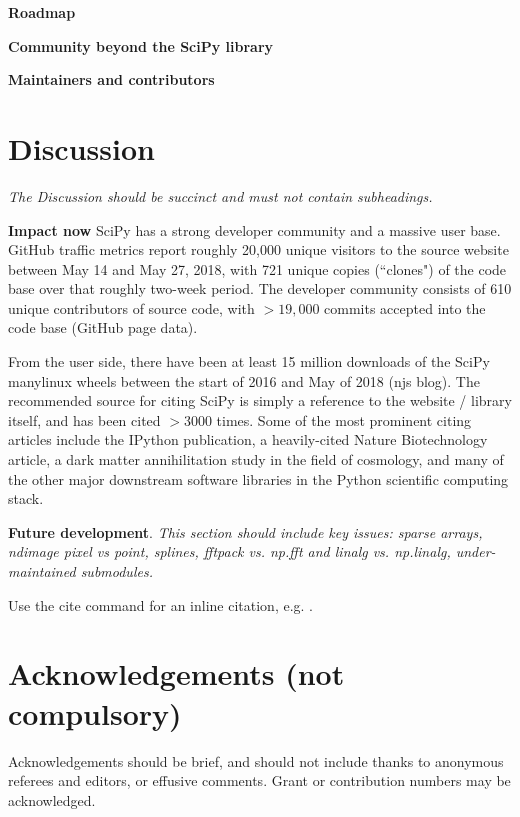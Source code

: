 \documentclass[fleqn,10pt]{wlscirep}
\begin{document}
\textbf{Roadmap}

\textbf{Community beyond the SciPy library}

\textbf{Maintainers and contributors}


\section*{Discussion}

\textit{The Discussion should be succinct and must not contain subheadings.}

\textbf{Impact now}
SciPy has a strong developer community and a massive user base. GitHub
traffic metrics report roughly 20,000 unique visitors to the source
website between May 14 and May 27, 2018, with 721 unique copies (``clones")
of the code base over that roughly two-week period. The developer community
consists of 610 unique contributors of source code, with $>19,000$ commits
accepted into the code base (GitHub page data).

From the user side, there have been at least 15 million downloads
of the SciPy manylinux wheels between the start of 2016 and May of 2018
(njs blog). The recommended source for citing SciPy is simply a reference
to the website / library itself\cite{SciPylib}, and has been cited $>3000$
times. Some of the most prominent citing articles include the IPython
publication\cite{PER-GRA:2007}, a heavily-cited Nature Biotechnology
article\cite{pmid17287757}, a dark
matter annihilitation study in the field of
cosmology\cite{1475-7516-2012-08-007}, and many of the
other major downstream software libraries in the Python scientific
computing stack.

\textbf{Future development}.
\textit{This section should include key issues: sparse arrays, ndimage pixel vs point, splines, fftpack vs. np.fft and linalg vs. np.linalg, under-maintained submodules.}




\noindent Use the cite command for an inline citation, e.g. \cite{behnel2011cython}.

\section*{Acknowledgements (not compulsory)}

Acknowledgements should be brief, and should not include thanks to anonymous referees and editors, or effusive comments. Grant or contribution numbers may be acknowledged.
\end{document}
